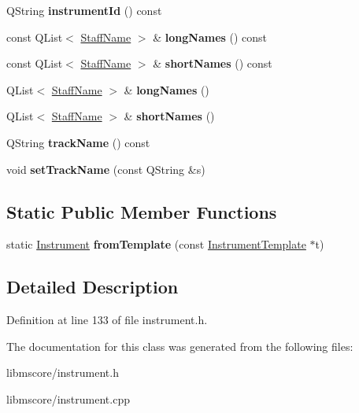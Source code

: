 \begin{DoxyCompactItemize}
\mbox{\label{class_ms_1_1_instrument_a27153e56433f34c380d6ffb121043aff}} 
Q\+String {\bfseries instrument\+Id} () const
\item 
\mbox{\label{class_ms_1_1_instrument_a830681075fd99c1aa45d28f95486990e}} 
const Q\+List$<$ \hyperlink{class_ms_1_1_staff_name}{Staff\+Name} $>$ \& {\bfseries long\+Names} () const
\item 
\mbox{\label{class_ms_1_1_instrument_a98587cf1ebaaeb27874429e68bf47ccf}} 
const Q\+List$<$ \hyperlink{class_ms_1_1_staff_name}{Staff\+Name} $>$ \& {\bfseries short\+Names} () const
\item 
\mbox{\label{class_ms_1_1_instrument_a985473d44bd902d7566a05f3a8794464}} 
Q\+List$<$ \hyperlink{class_ms_1_1_staff_name}{Staff\+Name} $>$ \& {\bfseries long\+Names} ()
\item 
\mbox{\label{class_ms_1_1_instrument_adb49f3a990d855489a2194414e2e9172}} 
Q\+List$<$ \hyperlink{class_ms_1_1_staff_name}{Staff\+Name} $>$ \& {\bfseries short\+Names} ()
\item 
\mbox{\label{class_ms_1_1_instrument_a96a6135ca18ef424be2db795d50c6c11}} 
Q\+String {\bfseries track\+Name} () const
\item 
\mbox{\label{class_ms_1_1_instrument_a53d05a717400cc25f6e7cabf399b4e68}} 
void {\bfseries set\+Track\+Name} (const Q\+String \&s)
\end{DoxyCompactItemize}
\subsection*{Static Public Member Functions}
\begin{DoxyCompactItemize}
\item 
\mbox{\label{class_ms_1_1_instrument_a65d8e0fadc7e6d2b6cd64c37094ed43e}} 
static \hyperlink{class_ms_1_1_instrument}{Instrument} {\bfseries from\+Template} (const \hyperlink{class_ms_1_1_instrument_template}{Instrument\+Template} $\ast$t)
\end{DoxyCompactItemize}


\subsection{Detailed Description}


Definition at line 133 of file instrument.\+h.



The documentation for this class was generated from the following files\+:\begin{DoxyCompactItemize}
\item 
libmscore/instrument.\+h\item 
libmscore/instrument.\+cpp\end{DoxyCompactItemize}

